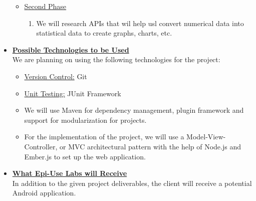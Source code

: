 \documentclass[a4paper,12pt]{article}
\begin{document}
\begin{itemize}
\begin{itemize}
	\item \underline{Second Phase}

		\begin{enumerate}
		\item We will research APIs that wil help usl convert numerical data into statistical data to create graphs, charts, 				etc.
		\end{enumerate}

	\end{itemize}

\bigskip
\item {\large \underline{\textbf{Possible Technologies to be Used}}}\\[0.2cm]
We are planning on using the following technologies for the project:
	\begin{itemize}
		\item \underline {Version Control:} Git
		\\
		\item  \underline{Unit Testing:} JUnit Framework
		\\
		\item We will use Maven for dependency management, plugin framework and support for modularization for 				projects.
		\\
		\item For the implementation of the project, we will use a Model-View-Controller, or MVC architectural pattern with 			the help of Node.js and Ember.js to set up the web application.
	\end{itemize}

\bigskip
 \item {\large \underline{\textbf{What Epi-Use Labs will Receive}}}\\[0.2cm]
In addition to the given project deliverables, the client will receive a potential Android application. 
\end{itemize}
\end{document}

